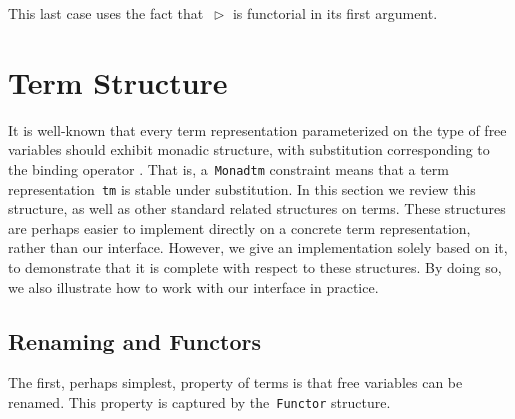 \documentclass[9pt,authoryear]{sigplanconf}
\begin{document}
%
This last case uses the fact that{~}\texttt{\makebox[1.22ex][l]{$ {(} $}}\texttt{$ \vartriangleright $}\texttt{\makebox[1.22ex][r]{$ {)} $}} is functorial in its first argument.%


\section{Term Structure\label{termStructure}}

%
It is well-known that every term representation parameterized
    on the type of free variables should exhibit monadic structure,
    with substitution corresponding to the binding operator \cite{bellegarde-94,bird-paterson-99,altenkirch-reus-99}. That is, a{~}\texttt{Monad}\texttt{\mbox{\hspace{0.50em}}}\texttt{tm} constraint means that a
    term representation{~}\texttt{tm} is stable under substitution. In this
    section we review this structure, as well as other standard
    related structures on terms. These structures are perhaps easier
    to implement directly on a concrete term representation, rather
    than our interface. However, we give an implementation solely based
    on it, to demonstrate that it is complete with respect to these
    structures. By doing so, we also illustrate how to work with our
    interface in practice.%


\subsection{Renaming and Functors\label{functorSec}}

%
The first, perhaps simplest, property of terms is that free
    variables can be renamed. This property is captured by
    the{~}\texttt{Functor} structure.%
\end{document}
